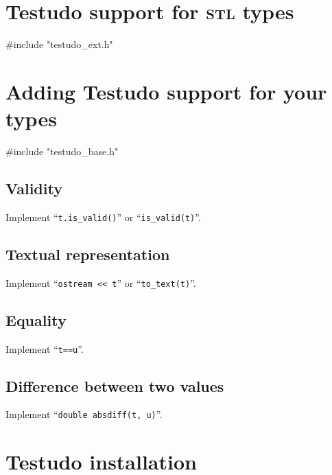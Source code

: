 \documentclass[twoside, a4paper, article]{memoir}
\begin{document}
\chapter{Testudo support for \textsc{stl} types}
\label{cha:testudo-support-stl-types}

\begin{cpplisting}
#include "testudo_ext.h"
\end{cpplisting}


\chapter{Adding Testudo support for your types}
\label{cha:adding-testudo-support-your-types}

\begin{cpplisting}
#include "testudo_base.h"
\end{cpplisting}

\section{Validity}
\label{sec:validity}

Implement ``\texttt{t.is\_valid()}'' or ``\texttt{is\_valid(t)}''.

\section{Textual representation}
\label{sec:textual-representation}

Implement ``\texttt{ostream <{}< t}'' or ``\texttt{to\_text(t)}''.

\section{Equality}
\label{sec:equality}

Implement ``\texttt{t==u}''.

\section{Difference between two values}
\label{sec:difference-between-two-values}

Implement ``\texttt{double absdiff(t, u)}''.


\cleartooddpage

\appendices

\chapter{Testudo installation}
\label{cha:testudo-installation}
\end{document}
